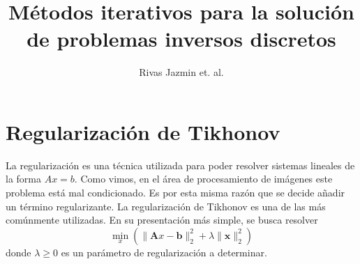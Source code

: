 \documentclass[12pt, oneside]{book}
\title{Métodos iterativos para la solución de problemas inversos discretos}
\author{Rivas Jazmin et. al.}
\date{}
\begin{document}
	\maketitle
	\tableofcontents
	
	
	\chapter{Regularización de Tikhonov}
	La regularización es una técnica utilizada para poder resolver sistemas lineales de la forma $Ax = b$. Como vimos, en el área de procesamiento de imágenes este problema está mal condicionado. Es por esta misma razón que se decide añadir un término regularizante.
	La regularización de Tikhonov es una de las más comúnmente utilizadas. En su presentación más simple, se busca resolver \\[10pt]
	 \begin{equation}
	 	\min_{x} \left( \| \mathbf{A}x - \mathbf{b} \|_2^2 + \lambda \| \mathbf{x} \|_2^2 \right)
	 \end{equation}
	 donde $\lambda \geq 0$ es un parámetro de regularización a determinar.
	 
\end{document}
